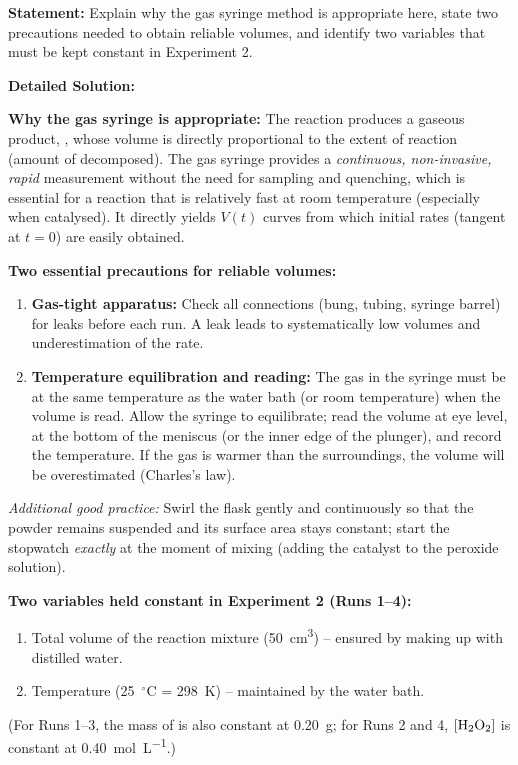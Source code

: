 \documentclass[11pt]{article}
\begin{document}
\begin{exoresolu}
\textbf{Statement:} Explain why the gas syringe method is appropriate here, state two precautions needed to obtain reliable volumes, and identify two variables that must be kept constant in Experiment 2.

\tcblower
\textbf{Detailed Solution:}

\textbf{Why the gas syringe is appropriate:}
The reaction produces a gaseous product, , whose volume is directly proportional to the extent of reaction (amount of  decomposed). The gas syringe provides a \emph{continuous, non-invasive, rapid} measurement without the need for sampling and quenching, which is essential for a reaction that is relatively fast at room temperature (especially when catalysed). It directly yields $V(t)$ curves from which initial rates (tangent at $t=0$) are easily obtained.

\textbf{Two essential precautions for reliable volumes:}
\begin{enumerate}
    \item \textbf{Gas-tight apparatus:} Check all connections (bung, tubing, syringe barrel) for leaks before each run. A leak leads to systematically low volumes and underestimation of the rate.
    \item \textbf{Temperature equilibration and reading:} The gas in the syringe must be at the same temperature as the water bath (or room temperature) when the volume is read. Allow the syringe to equilibrate; read the volume at eye level, at the bottom of the meniscus (or the inner edge of the plunger), and record the temperature. If the gas is warmer than the surroundings, the volume will be overestimated (Charles's law).
\end{enumerate}
\textit{Additional good practice:} Swirl the flask gently and continuously so that the  powder remains suspended and its surface area stays constant; start the stopwatch \emph{exactly} at the moment of mixing (adding the catalyst to the peroxide solution).

\textbf{Two variables held constant in Experiment 2 (Runs 1--4):}
\begin{enumerate}
    \item Total volume of the reaction mixture (\SI{50}{cm^3}) -- ensured by making up with distilled water.
    \item Temperature (\SI{25}{\ensuremath{{}^{\circ}\mathrm{C}}} = \SI{298}{K}) -- maintained by the water bath.
\end{enumerate}
(For Runs 1--3, the mass of  is also constant at \SI{0.20}{g}; for Runs 2 and 4, $[\ce{H2O2}]$ is constant at \SI{0.40}{mol.L^{-1}}.)
\end{exoresolu}
\end{document}
